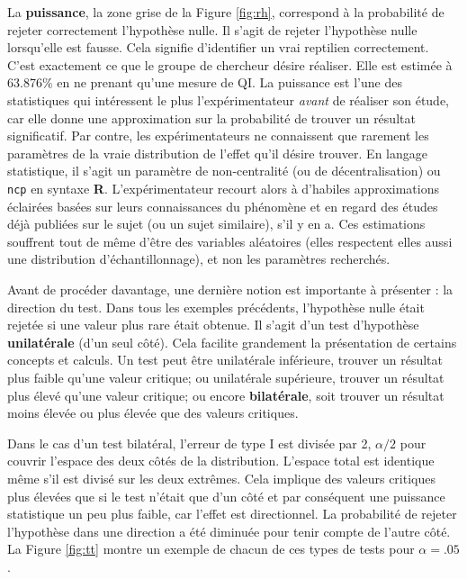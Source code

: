 \documentclass[
]{book}
\begin{document}
La \textbf{puissance}, la zone grise de la Figure \ref{fig:rh}, correspond à la probabilité de rejeter correctement l'hypothèse nulle. Il s'agit de rejeter l'hypothèse nulle lorsqu'elle est fausse. Cela signifie d'identifier un vrai reptilien correctement. C'est exactement ce que le groupe de chercheur désire réaliser. Elle est estimée à 63.876\% en ne prenant qu'une mesure de QI. La puissance est l'une des statistiques qui intéressent le plus l'expérimentateur \emph{avant} de réaliser son étude, car elle donne une approximation sur la probabilité de trouver un résultat significatif. Par contre, les expérimentateurs ne connaissent que rarement les paramètres de la vraie distribution de l'effet qu'il désire trouver. En langage statistique, il s'agit un paramètre de non-centralité (ou de décentralisation) ou \texttt{ncp} en syntaxe \textbf{R}. L'expérimentateur recourt alors à d'habiles approximations éclairées basées sur leurs connaissances du phénomène et en regard des études déjà publiées sur le sujet (ou un sujet similaire), s'il y en a. Ces estimations souffrent tout de même d'être des variables aléatoires (elles respectent elles aussi une distribution d'échantillonnage), et non les paramètres recherchés.

Avant de procéder davantage, une dernière notion est importante à présenter : la direction du test. Dans tous les exemples précédents, l'hypothèse nulle était rejetée si une valeur plus rare était obtenue. Il s'agit d'un test d'hypothèse \textbf{unilatérale} (d'un seul côté). Cela facilite grandement la présentation de certains concepts et calculs. Un test peut être unilatérale inférieure, trouver un résultat plus faible qu'une valeur critique; ou unilatérale supérieure, trouver un résultat plus élevé qu'une valeur critique; ou encore \textbf{bilatérale}, soit trouver un résultat moins élevée ou plus élevée que des valeurs critiques.

Dans le cas d'un test bilatéral, l'erreur de type I est divisée par 2, \(\alpha/2\) pour couvrir l'espace des deux côtés de la distribution. L'espace total est identique même s'il est divisé sur les deux extrêmes. Cela implique des valeurs critiques plus élevées que si le test n'était que d'un côté et par conséquent une puissance statistique un peu plus faible, car l'effet est directionnel. La probabilité de rejeter l'hypothèse dans une direction a été diminuée pour tenir compte de l'autre côté. La Figure \ref{fig:tt} montre un exemple de chacun de ces types de tests pour \(\alpha = .05\).
\end{document}
